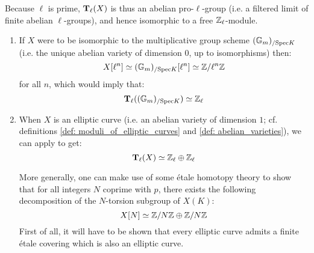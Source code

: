 \begin{example}
\begin{enumerate}
\begin{itemize}
                                Because $\ell$ is prime, $\mathbf{T}_{\ell}(X)$ is thus an abelian pro-$\ell$-group (i.e. a filtered limit of finite abelian $\ell$-groups), and hence isomorphic to a free $\mathbb{Z}_{\ell}$-module. 
                                    \begin{enumerate}
                                        \item If $X$ were to be isomorphic to the multiplicative group scheme $(\mathbb{G}_m)_{/\mathrm{Spec} K}$ (i.e. the unique abelian variety of dimension $0$, up to isomorphisms) then:
                                            $$X[\ell^n] \simeq (\mathbb{G}_m)_{/\mathrm{Spec} K}[\ell^n] \simeq \mathbb{Z}/\ell^n\mathbb{Z}$$
                                        for all $n$, which would imply that:
                                            $$\mathbf{T}_{\ell}( (\mathbb{G}_m)_{/\mathrm{Spec} K} ) \simeq \mathbb{Z}_{\ell}$$
                                        \item When $X$ is an elliptic curve (i.e. an abelian variety of dimension $1$; cf. definitions \ref{def: moduli_of_elliptic_curves} and \ref{def: abelian_varieties}), we can apply \cite[Corollary 6.4]{silverman_elliptic_curves} to get:
                                            $$\mathbf{T}_{\ell}(X) \simeq \mathbb{Z}_{\ell} \oplus \mathbb{Z}_{\ell}$$
                                        
                                        More generally, one can make use of some \'etale homotopy theory to show that for all integers $N$ coprime with $p$, there exists the following decomposition of the $N$-torsion subgroup of $X(K)$:
                                            $$X[N] \simeq \mathbb{Z}/N\mathbb{Z} \oplus \mathbb{Z}/N\mathbb{Z}$$
                                        First of all, it will have to be shown that every elliptic curve admits a finite \'etale covering which is also an elliptic curve. 
                                    \end{enumerate}
                            \end{itemize}
                    \end{enumerate}
                \end{example}
            

